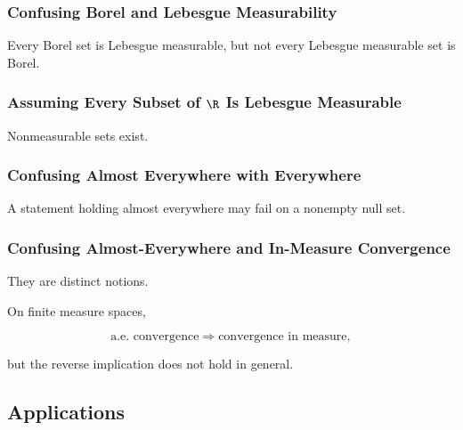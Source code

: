 \subsubsection{Confusing Borel and Lebesgue Measurability}

Every Borel set is Lebesgue measurable, but not every Lebesgue measurable
set is Borel.

\subsubsection{Assuming Every Subset of \(\R\) Is Lebesgue Measurable}

Nonmeasurable sets exist.

\subsubsection{Confusing Almost Everywhere with Everywhere}

A statement holding almost everywhere may fail on a nonempty null set.

\subsubsection{Confusing Almost-Everywhere and In-Measure Convergence}

They are distinct notions.

On finite measure spaces,

\[
\text{a.e. convergence}
\Longrightarrow
\text{convergence in measure},
\]

but the reverse implication does not hold in general.

\subsection{Applications}
\label{subsec:measure-theory-applications}


